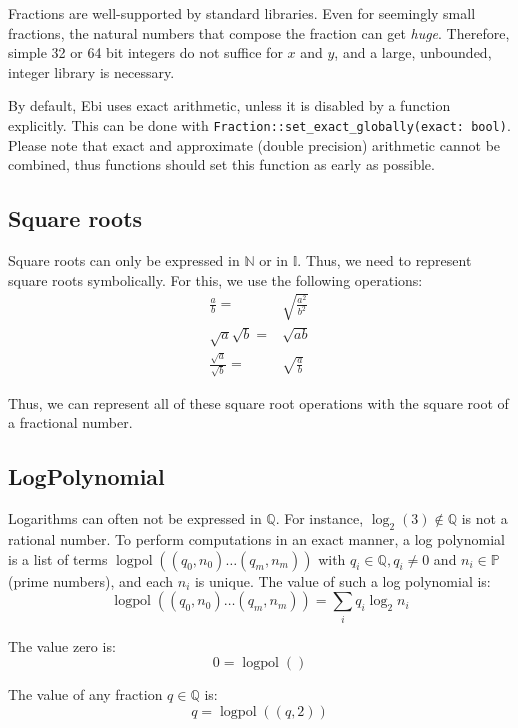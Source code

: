 \documentclass{book}
\DeclareMathOperator{\logpol}{logpol}
\begin{document}
        Fractions are well-supported by standard libraries.
        Even for seemingly small fractions, the natural numbers that compose the fraction can get \emph{huge}.
        Therefore, simple 32 or 64 bit integers do not suffice for $x$ and $y$, and a large, unbounded, integer library is necessary.
    
        By default, Ebi uses exact arithmetic, unless it is disabled by a function explicitly.
        This can be done with \verb=Fraction::set_exact_globally(exact: bool)=.
        Please note that exact and approximate (double precision) arithmetic cannot be combined, thus functions should set this function as early as possible.

        \subsection{Square roots}
            Square roots can only be expressed in $\mathbb{N}$ or in $\mathbb{I}$.
            Thus, we need to represent square roots symbolically.
            For this, we use the following operations:
            \begin{align*}
                \frac{a}{b} ={}& \sqrt{\frac{a^2}{b^2}}\\
                \sqrt{a} \sqrt{b} ={}& \sqrt{a b}\\
                \frac{\sqrt{a}}{\sqrt{b}} ={}& \sqrt{\frac{a}{b}}
            \end{align*}
    
            Thus, we can represent all of these square root operations with the square root of a fractional number.

        \subsection{LogPolynomial}
            Logarithms can often not be expressed in $\mathbb{Q}$.
            For instance, $\log_2(3) \notin \mathbb{Q}$ is not a rational number.
            To perform computations in an exact manner, a log polynomial is a list of terms 
            $\logpol((q_0, n_0) \ldots (q_m, n_m))$ with $q_i \in \mathbb{Q}, q_i \neq 0$ and $n_i \in \mathbb{P}$ (prime numbers), and each $n_i$ is unique.
            The value of such a log polynomial is:
            $$\logpol((q_0, n_0) \ldots (q_m, n_m)) = \sum_i q_i \log_2 n_i$$

            The value zero is:
            $$ 0 = \logpol()$$

            The value of any fraction $q \in \mathbb{Q}$ is:
            $$ q = \logpol((q, 2))$$
\end{document}
